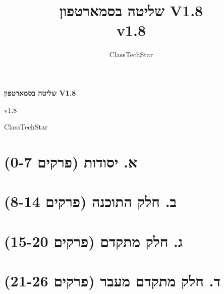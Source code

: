 \documentclass[11pt,a4paper,openany]{book}
\title{שליטה בסמארטפון V1.8\\ \large v1.8}
\author{ClassTechStar}
\date{}
\begin{document}
\begin{titlepage}
\centering
\vspace*{0.28\textheight}
{\Huge\bfseries שליטה בסמארטפון V1.8\par}
\vspace{1.2em}
{\Large v1.8\par}
\vfill
{\large ClassTechStar\par}
\end{titlepage}
\frontmatter
\tableofcontents
\mainmatter
\part*{א. יסודות (פרקים 0-7)}










\part*{ב. חלק התוכנה (פרקים 8-14)}








\part*{ג. חלק מתקדם (פרקים 15-20)}







\part*{ד. חלק מתקדם מעבר (פרקים 21-26)}







\end{document}
